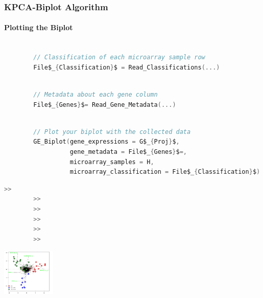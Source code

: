 \documentclass[serif]{beamer}
\newcommand{\codepause}{\pause \vspace{-0.165in} }
\begin{document}
	\begin{frame}[t, fragile]
		\frametitle{KPCA-Biplot Algorithm}
		\framesubtitle{Plotting the Biplot}
		
		\begin{lstlisting}[mathescape, language=C]
		
		// Classification of each microarray sample row
		File$_{Classification}$ = Read_Classifications(...)
		\end{lstlisting}
		\codepause
		\begin{lstlisting}[mathescape, language=C]
		
		// Metadata about each gene column
		File$_{Genes}$= Read_Gene_Metadata(...)
		\end{lstlisting}
		\codepause
		\begin{lstlisting}[mathescape, language=C]
		
		// Plot your biplot with the collected data
		GE_Biplot(gene_expressions = G$_{Proj}$,
		          gene_metadata = File$_{Genes}$=,
		          microarray_samples = H,
		          microarray_classification = File$_{Classification}$)
		\end{lstlisting}
		\begin{lstlisting}[mathescape, language=C]
		>>
		>>
		>>
		>> 
		>>
		>>
		\end{lstlisting}
		\vspace{-1.17in}
		\begin{center}
		\raggedright \hspace{0.2in}
		\includegraphics[width=1.0in]{images/biplot_output}	
		\end{center}
		\codepause
		
		
	\end{frame}
	
\end{document}
